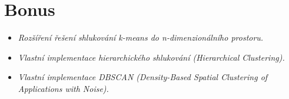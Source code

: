 \section{Bonus}

\begin{itemize}
    \item \textit{Rozšíření řešení shlukování k-means do n-dimenzionálního prostoru.}
    \item \textit{Vlastní implementace hierarchického shlukování (Hierarchical Clustering).}
    \item \textit{Vlastní implementace DBSCAN (Density-Based Spatial Clustering of Applications with Noise).}
\end{itemize}
